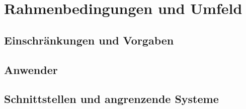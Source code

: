 \section{Rahmenbedingungen und Umfeld}

\subsection{Einschränkungen und Vorgaben}

\subsection{Anwender}

\subsection{Schnittstellen und angrenzende Systeme} 
